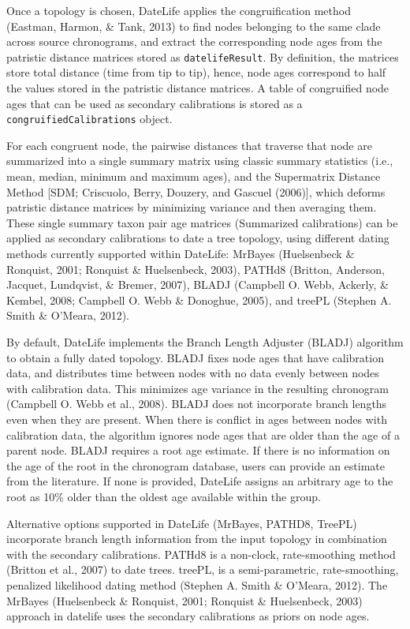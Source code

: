 \documentclass[
  english,
  man]{apa6}
\begin{document}
Once a topology is chosen, DateLife applies the congruification method (Eastman, Harmon, \& Tank, 2013) to find nodes belonging to the same clade across source chronograms, and extract the corresponding node ages from the patristic distance matrices stored as \texttt{datelifeResult}. By definition, the matrices store total distance (time from tip to tip), hence, node ages correspond to half the values stored in the patristic distance matrices.
A table of congruified node ages that can be used as secondary calibrations is stored as a \texttt{congruifiedCalibrations} object.

For each congruent node, the pairwise distances that traverse that node are summarized into a single summary matrix using classic summary statistics (i.e., mean, median, minimum and maximum ages), and the Supermatrix Distance Method {[}SDM; Criscuolo, Berry, Douzery, and Gascuel (2006){]}, which deforms patristic distance matrices by minimizing variance and then averaging them.
These single summary taxon pair age matrices (Summarized calibrations) can be applied as secondary calibrations to date a tree topology, using different dating methods currently supported within DateLife: MrBayes (Huelsenbeck \& Ronquist, 2001; Ronquist \& Huelsenbeck, 2003), PATHd8 (Britton, Anderson, Jacquet, Lundqvist, \& Bremer, 2007), BLADJ (Campbell O. Webb, Ackerly, \& Kembel, 2008; Campbell O. Webb \& Donoghue, 2005), and treePL (Stephen A. Smith \& O'Meara, 2012).

By default, DateLife implements the Branch Length Adjuster (BLADJ) algorithm to obtain a fully dated topology. BLADJ fixes node ages that have calibration data, and distributes time between nodes with no data evenly between nodes with calibration data.
This minimizes age variance in the resulting chronogram (Campbell O. Webb et al., 2008).
BLADJ does not incorporate branch lengths even when they are present.
When there is conflict in ages between nodes with calibration data, the algorithm ignores node ages that are older than the age of a parent node.
BLADJ requires a root age estimate. If there is no information on the age of the root in the chronogram database, users can provide an estimate from the literature. If none is provided, DateLife assigns an arbitrary age to the root as 10\% older than the oldest age available within the group.

Alternative options supported in DateLife (MrBayes, PATHD8, TreePL) incorporate branch length information from the input topology in combination with the secondary calibrations.
PATHd8 is a non-clock, rate-smoothing method (Britton et al., 2007) to date trees.
treePL, is a semi-parametric, rate-smoothing, penalized likelihood dating method
(Stephen A. Smith \& O'Meara, 2012).
The MrBayes (Huelsenbeck \& Ronquist, 2001; Ronquist \& Huelsenbeck, 2003) approach in datelife uses the secondary calibrations as priors on node ages.
\end{document}
